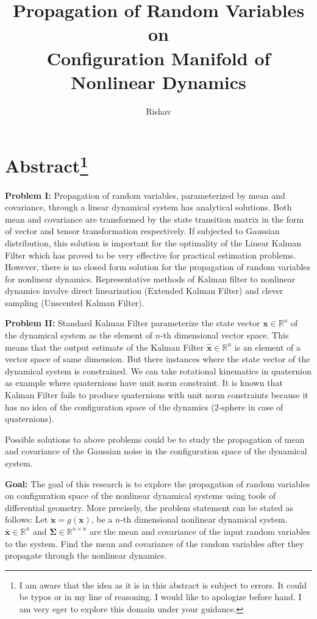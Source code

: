\documentclass[12pt]{article}
\title{Propagation of Random Variables on \\Configuration Manifold of \\Nonlinear Dynamics}
\author{Rishav}
\begin{document}
\maketitle

\section*{Abstract\footnote{I am aware that the idea as it is in this abstract is subject to errors. It could be typos or in my line of reasoning. I would like to apologize before hand. I am very eger to explore this domain under your guidance.}}

\textbf{Problem I: } Propagation of random variables, parameterized by mean and covariance, through a linear dynamical system has analytical solutions. Both mean and covariance are transformed by the state transition matrix in the form of vector and tensor transformation respectively. If subjected to Gaussian distribution, this solution is important for the optimality of the Linear Kalman Filter which has proved to be very effective for practical estimation problems. However, there is no closed form solution for the propagation of random variables for nonlinear dynamics. Representative methods of Kalman filter to nonlinear dynamics involve direct linearization (Extended Kalman Filter) and clever sampling (Unscented Kalman Filter). \medskip

\noindent
\textbf{Problem II: } Standard Kalman Filter parameterize the state vector $\bm{x}\in\mathbb{R}^{n}$ of the dynamical system as the element of $n$-th dimensional vector space. This means that the output estimate of the Kalman Filter $\hat{\bm{x}}\in\mathbb{R}^{n}$ is an element of a vector space of same dimension. But there instances where the state vector of the dynamical system is constrained. We can take rotational kinematics in quaternion as example where quaternions have unit norm constraint. It is known that Kalman Filter fails to produce quaternions with unit norm constraints because it has no idea of the configuration space of the dynamics (2-sphere in case of quaternions). \medskip

\noindent
Possible solutions to above problems could be to study the propagation of mean and covariance of the Gaussian noise in the configuration space of the dynamical system. \medskip

\noindent 
\textbf{Goal: } The goal of this research is to explore the propagation of random variables on configuration space of the nonlinear dynamical systems using tools of differential geometry. More precisely, the problem statement can be stated as follows: Let $\dot{\bm{x}} = g(\bm{x})$, be a $n$-th dimensional nonlinear dynamical system. $\bar{\bm{x}}\in\mathbb{R}^{n}$ and $\bm{\Sigma}\in\mathbb{R}^{n\times n}$ are the mean and covariance of the input random variables to the system. Find the mean and covariance of the random variables after they propagate through the nonlinear dynamics. \medskip
\end{document}
